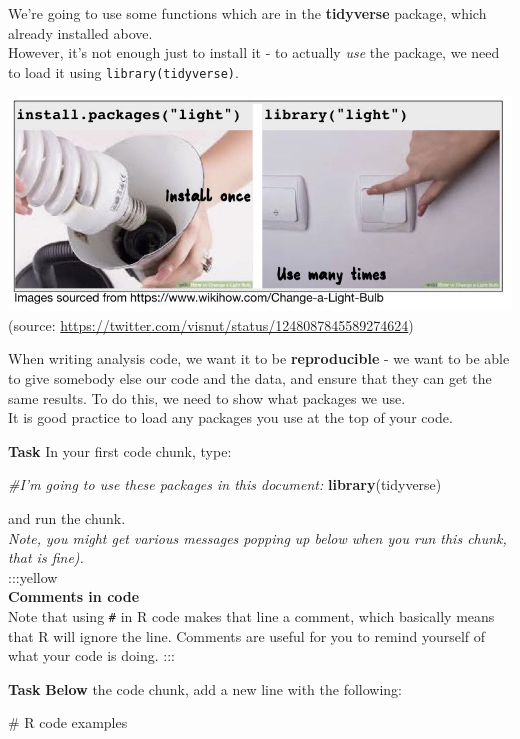 \documentclass[]{book}
\newenvironment{Shaded}{\begin{snugshade}}{\end{snugshade}}
\newcommand{\CommentTok}[1]{\textcolor[rgb]{0.56,0.35,0.01}{\textit{#1}}}
\newcommand{\KeywordTok}[1]{\textcolor[rgb]{0.13,0.29,0.53}{\textbf{#1}}}
\newcommand{\NormalTok}[1]{#1}
\begin{document}
We're going to use some functions which are in the \textbf{tidyverse} package, which already installed above.\\
However, it's not enough just to install it - to actually \emph{use} the package, we need to load it using \texttt{library(tidyverse)}.

\includegraphics{images/installing_intro/libraries.jpeg}
(source: \url{https://twitter.com/visnut/status/1248087845589274624})

When writing analysis code, we want it to be \textbf{reproducible} - we want to be able to give somebody else our code and the data, and ensure that they can get the same results. To do this, we need to show what packages we use.\\
It is good practice to load any packages you use at the top of your code.

\textbf{Task}
In your first code chunk, type:

\begin{Shaded}
\begin{Highlighting}[]
\CommentTok{#I'm going to use these packages in this document:}
\KeywordTok{library}\NormalTok{(tidyverse)}
\end{Highlighting}
\end{Shaded}

and run the chunk.\\
\emph{Note, you might get various messages popping up below when you run this chunk, that is fine).}\\
:::yellow\\
\textbf{Comments in code}\\
Note that using \texttt{\#} in R code makes that line a comment, which basically means that R will ignore the line. Comments are useful for you to remind yourself of what your code is doing.
:::

\textbf{Task}
\textbf{Below} the code chunk, add a new line with the following:

\# R code examples
\end{document}
